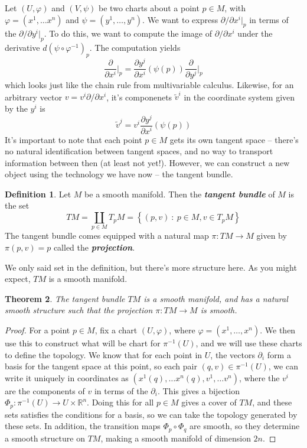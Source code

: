 \documentclass[psamsfonts]{amsart}
\newtheorem{thm}{Theorem}[section]
\theoremstyle{definition}
\newtheorem{defn}[thm]{Definition}
\theoremstyle{remark}
\newcommand{\R}{\mathbb{R}}
\newcommand{\ib}[1]{\textbf{\textit{#1}}}
\newcommand{\inv}{^{-1}}
\newcommand{\set}[1]{\left\lbrace #1 \right\rbrace}
\begin{document}
Let $(U, \varphi)$ and $(V, \psi)$ be two charts about a point $p \in M$, with
$\varphi = (x^1, \ldots x^n)$ and $\psi = (y^1, \ldots, y^n)$.
We want to express $\partial/\partial x^i\vert_p$ in terms of the
$\partial/\partial y^i\vert_p$. To do this, we want to compute the image of
$\partial / \partial x^i$ under the derivative $d(\psi \circ \varphi\inv)_p$.
The computation yields
$$\frac{\partial}{\partial x^i}\bigg\vert_p =
\frac{\partial y^j}{\partial x^i}(\psi(p)) \frac{\partial}{\partial y^j}\bigg\vert_p$$
which looks just like the chain rule from multivariable calculus. Likewise,
for an arbitrary vector $v = v^i \partial / \partial x^i$, it's componenets
$\tilde{v}^i$ in the coordinate system given by the $y^i$ is
$$\tilde{v}^j = v^i\frac{\partial y^j}{\partial x^i}(\psi(p)) $$
%
It's important to note that each point $p \in M$ gets its own tangent
space -- there's no natural identification between tangent spaces, and
no way to transport information between then (at least not yet!).
However, we can construct a new object using the technology we have
now -- the tangent bundle.
\begin{defn}
	Let $M$ be a smooth manifold. Then the \ib{tangent bundle} of $M$ is
	the set
	$$TM = \coprod_{p \in M} T_pM = \set{(p,v) ~:~ p \in M, v \in T_pM} $$
	The tangent bundle comes equipped with a natural map $\pi : TM \to M$
	given by $\pi(p,v) = p$ called the \ib{projection}.
\end{defn}
%
We only said set in the definition, but there's more structure here. As
you might expect, $TM$ is a smooth manifold.
%
\begin{thm}
	The tangent bundle $TM$ is a smooth manifold, and has a natural smooth
	structure such that the projection $\pi : TM \to M$ is smooth.
\end{thm}
%
\begin{proof}
For a point $p \in M$, fix a chart $(U, \varphi)$, where
$\varphi = (x^1, \ldots, x^n)$. We then use this to
construct what will be chart for $\pi\inv(U)$, and we will use these
charts to define the topology. We know that for each point in $U$, the
vectors $\partial_i$ form a basis for the tangent space at this point,
so each pair $(q,v) \in \pi\inv(U)$, we can write it uniquely in
coordinates as $(x^1(q), \ldots x^n(q), v^1, \ldots v^n)$, where the
$v^i$ are the components of $v$ in terms of the $\partial_i$. This gives
a bijection $\Phi_p : \pi\inv(U) \to U \times \R^n$. Doing this for
all $p \in M$ gives a cover of $TM$, and these sets satisfies the
conditions for a basis, so we can take the topology generated by these
sets. In addition, the transition maps $\Phi_p \circ \Phi_q$ are smooth,
so they determine a smooth structure on $TM$, making a smooth manifold
of dimension $2n$.
\end{proof}
\end{document}
